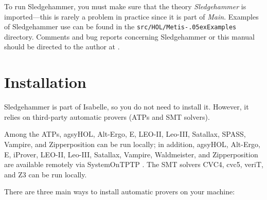 \documentclass[a4paper,12pt]{article}
\renewcommand\_{\hbox{\textunderscore\kern-.05ex}}
\begin{document}
To run Sledgehammer, you must make sure that the theory \textit{Sledgehammer} is
imported---this is rarely a problem in practice since it is part of
\textit{Main}. Examples of Sledgehammer use can be found in the
\texttt{src/HOL/Metis\_Examples} directory.  Comments and bug reports
concerning Sledgehammer or this manual should be directed to the author at
\authoremail.


\section{Installation}
\label{installation}

Sledgehammer is part of Isabelle, so you do not need to install it. However, it
relies on third-party automatic provers (ATPs and SMT solvers).

Among the ATPs, agsyHOL, Alt-Ergo, E, LEO-II, Leo-III, Satallax, SPASS, Vampire,
and Zipperposition can be run locally; in addition, agsyHOL, Alt-Ergo, E,
iProver, LEO-II, Leo-III, Satallax, Vampire, Waldmeister, and Zipperposition are
available remotely via System\-On\-TPTP \cite{sutcliffe-2000}. The SMT solvers
CVC4, cvc5, veriT, and Z3 can be run locally.

There are three main ways to install automatic provers on your machine:
\end{document}
